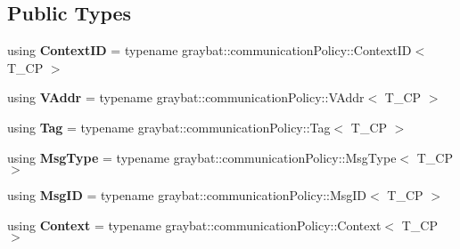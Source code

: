 \subsection*{Public Types}
\begin{DoxyCompactItemize}
\item 
\hypertarget{classgraybat_1_1communicationPolicy_1_1zmq_1_1Event_abac7cfd781f899c18bed620ae2aabc0e}{}using {\bfseries Context\+I\+D} = typename graybat\+::communication\+Policy\+::\+Context\+I\+D$<$ T\+\_\+\+C\+P $>$\label{classgraybat_1_1communicationPolicy_1_1zmq_1_1Event_abac7cfd781f899c18bed620ae2aabc0e}

\item 
\hypertarget{classgraybat_1_1communicationPolicy_1_1zmq_1_1Event_afb7d4ce6764c022a84e3a22bd1d50f3f}{}using {\bfseries V\+Addr} = typename graybat\+::communication\+Policy\+::\+V\+Addr$<$ T\+\_\+\+C\+P $>$\label{classgraybat_1_1communicationPolicy_1_1zmq_1_1Event_afb7d4ce6764c022a84e3a22bd1d50f3f}

\item 
\hypertarget{classgraybat_1_1communicationPolicy_1_1zmq_1_1Event_a8cb4e8b979b2fe2fa412f517675f8890}{}using {\bfseries Tag} = typename graybat\+::communication\+Policy\+::\+Tag$<$ T\+\_\+\+C\+P $>$\label{classgraybat_1_1communicationPolicy_1_1zmq_1_1Event_a8cb4e8b979b2fe2fa412f517675f8890}

\item 
\hypertarget{classgraybat_1_1communicationPolicy_1_1zmq_1_1Event_ab7b22a4bd40908151efa65a1b6971ca3}{}using {\bfseries Msg\+Type} = typename graybat\+::communication\+Policy\+::\+Msg\+Type$<$ T\+\_\+\+C\+P $>$\label{classgraybat_1_1communicationPolicy_1_1zmq_1_1Event_ab7b22a4bd40908151efa65a1b6971ca3}

\item 
\hypertarget{classgraybat_1_1communicationPolicy_1_1zmq_1_1Event_a00cb2d84a07cc107f528387819c672d8}{}using {\bfseries Msg\+I\+D} = typename graybat\+::communication\+Policy\+::\+Msg\+I\+D$<$ T\+\_\+\+C\+P $>$\label{classgraybat_1_1communicationPolicy_1_1zmq_1_1Event_a00cb2d84a07cc107f528387819c672d8}

\item 
\hypertarget{classgraybat_1_1communicationPolicy_1_1zmq_1_1Event_a0eec360c31102d48a4e966036d8dd83e}{}using {\bfseries Context} = typename graybat\+::communication\+Policy\+::\+Context$<$ T\+\_\+\+C\+P $>$\label{classgraybat_1_1communicationPolicy_1_1zmq_1_1Event_a0eec360c31102d48a4e966036d8dd83e}

\end{DoxyCompactItemize}
